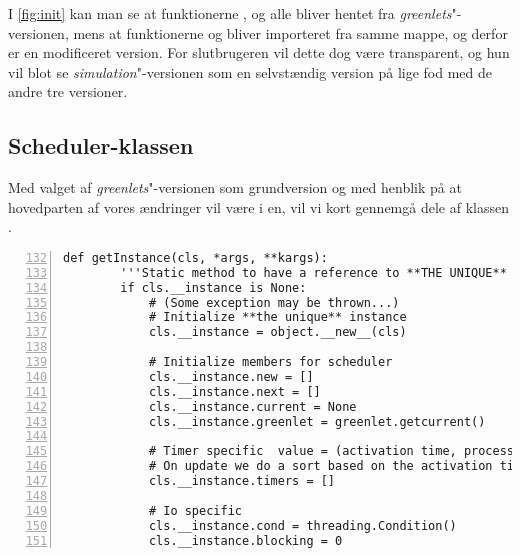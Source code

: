 I \cref{fig:init} kan man se at funktionerne ,  og  alle bliver hentet fra \emph{greenlets}"-versionen, mens at funktionerne  og  bliver importeret fra samme mappe, og derfor er en modificeret version. For slutbrugeren  vil dette dog være transparent, og hun vil blot se \emph{simulation}"-versionen som en selvstændig version på lige fod med de andre tre versioner.

\subsection{Scheduler-klassen}
\label{sec:scheduler}
Med valget af \emph{greenlets}"-versionen som grundversion og med henblik på at hovedparten af vores ændringer vil være i \sched en, vil vi kort gennemgå dele af klassen .

\begin{lstlisting}[firstnumber=132,stepnumber=5,numbers=left, float, label=fig:scheduling, caption=Uddrag af Scheduler.py i \emph{greenlets}versionen.]
    def getInstance(cls, *args, **kargs):
        '''Static method to have a reference to **THE UNIQUE** instance'''
        if cls.__instance is None:
            # (Some exception may be thrown...)
            # Initialize **the unique** instance
            cls.__instance = object.__new__(cls)

            # Initialize members for scheduler
            cls.__instance.new = []
            cls.__instance.next = []
            cls.__instance.current = None
            cls.__instance.greenlet = greenlet.getcurrent()

            # Timer specific  value = (activation time, process)
            # On update we do a sort based on the activation time
            cls.__instance.timers = []

            # Io specific
            cls.__instance.cond = threading.Condition()
            cls.__instance.blocking = 0
\end{lstlisting}

